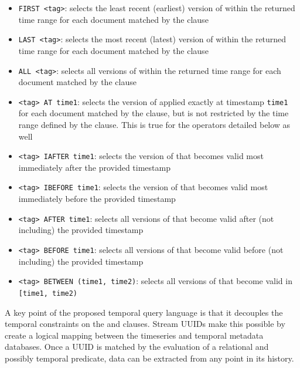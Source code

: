 \begin{itemize}
\item \texttt{FIRST <tag>}: selects the least recent (earliest) version of  within the returned time range for each document matched by the  clause
\item \texttt{LAST <tag>}: selects the most recent (latest) version of  within the returned time range for each document matched by the  clause
\item \texttt{ALL <tag>}: selects all versions of  within the returned time range for each document matched by the  clause
\item \texttt{<tag> AT time1}: selects the version of  applied
    exactly at timestamp \texttt{time1} for each document matched by the
     clause, but is not restricted by the time range defined by the
     clause. This is true for the operators detailed below as well
\item \texttt{<tag> IAFTER time1}: selects the version of  that becomes valid most immediately after the provided timestamp
\item \texttt{<tag> IBEFORE time1}: selects the version of  that becomes valid most immediately before the provided timestamp
\item \texttt{<tag> AFTER time1}: selects all versions of  that become valid after (not including) the provided timestamp
\item \texttt{<tag> BEFORE time1}: selects all versions of  that become valid before (not including) the provided timestamp
\item \texttt{<tag> BETWEEN (time1, time2)}: selects all versions of  that become valid in \texttt{[time1, time2)}
\end{itemize}

A key point of the proposed temporal query language is that it decouples the temporal constraints on the  and  clauses.
Stream UUIDs make this possible by create a logical mapping between the timeseries and temporal metadata databases. Once a UUID is matched by the evaluation
of a relational and possibly temporal predicate, data can be extracted from any point in its history.



